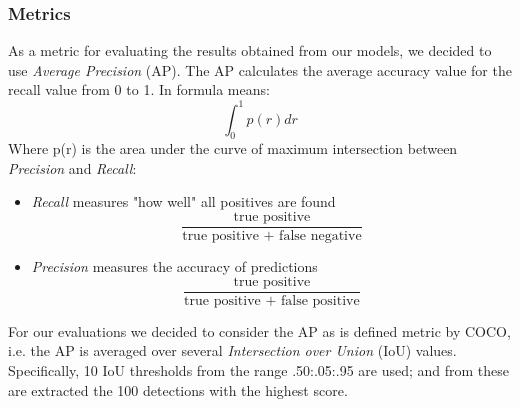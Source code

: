 \documentclass[10pt,twocolumn,letterpaper]{article}
\begin{document}
\subsubsection{Metrics}
As a metric for evaluating the results obtained from our models, we decided to use \textit{Average Precision} (AP). The AP calculates the average accuracy value for the recall value from 0 to 1. In formula means:
\begin{equation}
\int_0^1 p(r) dr 
\label{AP}
\end{equation}
\noindent
Where p(r) is the area under the curve of maximum intersection between \textit{Precision} and \textit{Recall}:
\begin{itemize}
\item \textit{Recall} measures "how well" all positives are found
\begin{equation}
\frac{\text{true positive}}{\text{true positive + false negative}}
\end{equation}
\item \textit{Precision} measures the accuracy of predictions
\begin{equation}
\frac{\text{true positive}}{\text{true positive + false positive}}
\end{equation}
\end{itemize}
\noindent
For our evaluations we decided to consider the AP as is defined metric by COCO, i.e. the AP is averaged over several \textit{Intersection over Union} (IoU) values.  Specifically, 10 IoU thresholds from the range .50:.05:.95 are used; and from these are extracted the 100 detections with the highest score.
\end{document}
